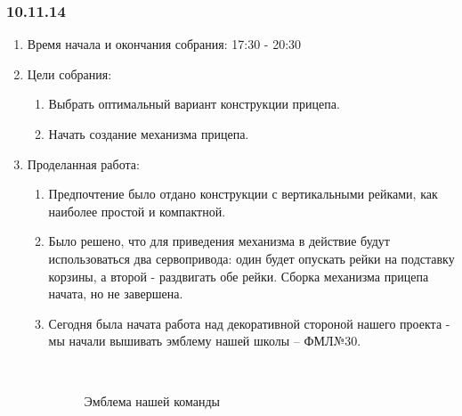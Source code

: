 
\subsubsection{10.11.14}

\begin{enumerate} 
	\item Время начала и окончания собрания:
	17:30 - 20:30
	\item Цели собрания:
	\begin{enumerate}
		\item Выбрать оптимальный вариант конструкции прицепа.
		
		\item Начать создание механизма прицепа.
		
	\end{enumerate}
	
	\item Проделанная работа:
	\begin{enumerate}
		\item Предпочтение было отдано конструкции с вертикальными рейками, как наиболее простой и компактной.
		
		\item Было решено, что для приведения механизма в действие будут использоваться два сервопривода: один будет опускать рейки на подставку корзины, а второй - раздвигать обе рейки. Сборка механизма прицепа начата, но не завершена.
		
		\item Сегодня была начата работа над декоративной стороной нашего проекта - мы начали вышивать эмблему нашей школы -- ФМЛ№30.
		
	    \begin{figure}[H]
			\begin{minipage}[h]{0.2\linewidth}
				\center  
			\end{minipage}
			\begin{minipage}[h]{0.6\linewidth}
				\caption{Эмблема нашей команды}
			\end{minipage}
		\end{figure}
		

\end{enumerate}
\end{enumerate}

